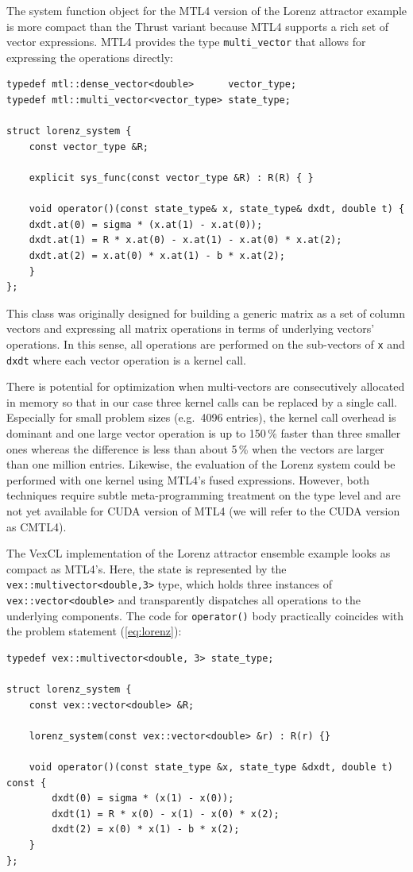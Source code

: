 \documentclass[final]{siamltex}
\newcommand{\code}[1]{\lstinline|#1|}
\newcommand{\eqref}[1]{(\ref{#1})}
\begin{document}
The system function object for the MTL4 version of the Lorenz attractor example is
more compact than the Thrust variant because MTL4 supports a rich set of vector
expressions.  MTL4 provides the type \code{multi_vector} that allows for
expressing the operations directly:
\begin{lstlisting}
typedef mtl::dense_vector<double>      vector_type;
typedef mtl::multi_vector<vector_type> state_type;

struct lorenz_system {
    const vector_type &R;

    explicit sys_func(const vector_type &R) : R(R) { }

    void operator()(const state_type& x, state_type& dxdt, double t) {
	dxdt.at(0) = sigma * (x.at(1) - x.at(0));
	dxdt.at(1) = R * x.at(0) - x.at(1) - x.at(0) * x.at(2);
	dxdt.at(2) = x.at(0) * x.at(1) - b * x.at(2);
    }
};
\end{lstlisting}
This class was originally designed for building a generic matrix as a set of
column vectors and expressing all matrix operations in terms of underlying
vectors' operations.
In this sense, all operations are performed on the sub-vectors of \code{x} and
\code{dxdt} where each vector operation is a kernel call.

There is potential for optimization when multi-vectors are consecutively allocated
in memory so that in our case three kernel calls can be replaced by a single call.
Especially for small problem sizes (e.g.~4096 entries), the kernel call overhead
is dominant and one large vector operation is up to 150\,\% faster than three smaller
ones whereas the difference is less than about 5\,\% when the vectors are
larger than one million entries.
Likewise, the evaluation of the Lorenz system could be performed with one kernel
using MTL4's fused expressions.
However, both techniques require subtle meta-programming treatment on the type level and
are not yet available for CUDA version of MTL4 (we will refer to the CUDA
version as CMTL4).

The VexCL implementation of the Lorenz attractor ensemble example looks as
compact as MTL4's. Here, the state is represented by the
\code{vex::multivector<double,3>} type, which holds three instances of
\code{vex::vector<double>} and transparently dispatches all operations to the
underlying components. The code for \code{operator()} body practically
coincides with the problem statement \eqref{eq:lorenz}:
\begin{lstlisting}
typedef vex::multivector<double, 3> state_type;

struct lorenz_system {
    const vex::vector<double> &R;

    lorenz_system(const vex::vector<double> &r) : R(r) {}

    void operator()(const state_type &x, state_type &dxdt, double t) const {
        dxdt(0) = sigma * (x(1) - x(0));
        dxdt(1) = R * x(0) - x(1) - x(0) * x(2);
        dxdt(2) = x(0) * x(1) - b * x(2);
    }
};
\end{lstlisting}
\end{document}
